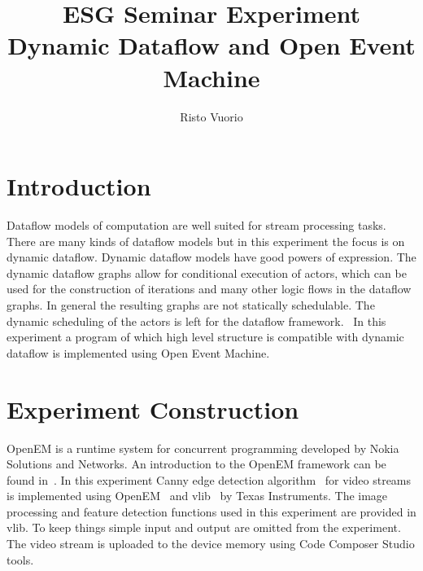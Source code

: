 \documentclass[a4paper,10pt]{article}
\begin{document}
%
\title{ESG Seminar Experiment \\ Dynamic Dataflow and Open Event Machine}

\author{Risto Vuorio}

\maketitle

\begin{abstract}
\end{abstract}

\section{Introduction}
Dataflow models of computation are well suited for stream processing tasks. There are many kinds of dataflow models but in this experiment the focus is on dynamic dataflow. Dynamic dataflow models have good powers of expression. The dynamic dataflow graphs allow for conditional execution of actors, which can be used for the construction of iterations and many other logic flows in the dataflow graphs. In general the resulting graphs are not statically schedulable. The dynamic scheduling of the actors is left for the dataflow framework.~\cite{semmapaperi} In this experiment a program of which high level structure is compatible with dynamic dataflow is implemented using Open Event Machine.

\section{Experiment Construction}
OpenEM is a runtime system for concurrent programming developed by Nokia Solutions and Networks. An introduction to the OpenEM framework can be found in~\cite{dippa}. In this experiment Canny edge detection algorithm~\cite{canny} for video streams is implemented using OpenEM~\cite{openemwhite} and vlib~\cite{vlib} by Texas Instruments. The image processing and feature detection functions used in this experiment are provided in vlib. To keep things simple input and output are omitted from the experiment. The video stream is uploaded to the device memory using Code Composer Studio tools.
\end{document}

